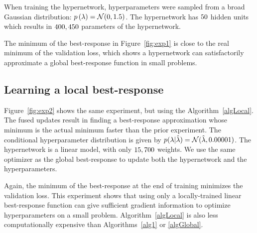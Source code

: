 \documentclass{article} %
\newcommand{\prior}[1]{p \left( #1 \right)} %
\newcommand{\hyper}{\lambda} %
\newcommand{\hyperFixed}{\hyper} %
\newcommand{\hyperDist}{\prior{\hyper}} %
\newcommand{\sampleRename}[1]{#1} %
\newcommand{\curRename}[1]{\smash{\hat{#1}}} %
\newcommand{\hyperDistVar}{p ( \sampleRename{\hyper} | \curRename{\hyper} )} %
\begin{document}
When training the hypernetwork, hyperparameters were sampled from a broad Gaussian distribution: $\hyperDist = \mathcal{N} ( \hyperMeanGlobal, \hyperVarGlobal )$.
The hypernetwork has $50$ hidden units which results in $400,450$ parameters of the hypernetwork.

The minimum of the best-response in Figure~\ref{fig:exp1} is close to the real minimum of the validation loss, which shows a hypernetwork can satisfactorily approximate a global best-response function in small problems.

\subsection{Learning a local best-response}
Figure~\ref{fig:exp2} shows the same experiment, but using the Algorithm~\ref{algLocal}.
The fused updates result in finding a best-response approximation whose minimum is the actual minimum faster than the prior experiment.
The conditional hyperparameter distribution is given by $\hyperDistVar = \mathcal{N} ( \curRename{\hyperFixed}, 0.00001)$.
The hypernetwork is a linear model, with only $15,700$ weights.
We use the same optimizer as the global best-response to update both the hypernetwork and the hyperparameters.

Again, the minimum of the best-response at the end of training minimizes the validation loss.
This experiment shows that using only a locally-trained linear best-response function can give sufficient gradient information to optimize hyperparameters on a small problem.
Algorithm~\ref{algLocal} is also less computationally expensive than Algorithms~\ref{alg1} or \ref{algGlobal}.
\end{document}
